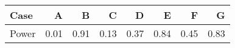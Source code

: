 \begin{tabular}{l|rrrrrrr}
Case & A & B & C & D & E & F & G \\ \hline
Power & 0.01  &  0.91  &  0.13  &  0.37  &  0.84  &  0.45  &  0.83 
\end{tabular}
